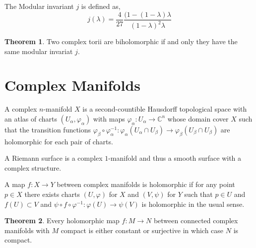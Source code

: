 \documentclass[12pt]{extarticle}
\newcommand{\C}{\mathbb{C}}
\theoremstyle{definition}
\newtheorem{theorem}{Theorem}[section]
\newenvironment{definition}[1][Definition:]{\begin{trivlist}
\item[\hskip \labelsep {\bfseries #1}]}{\end{trivlist}}
\begin{document}
\begin{definition}
The Modular invariant $j$ is defined as,
\[ j(\lambda) = \frac{4}{27} \frac{(1 - (1 - \lambda)\lambda}{(1 - \lambda)^2 \lambda} \]
\end{definition}  

\begin{theorem}
Two complex torii are biholomorphic if and only they have the same modular invariat $j$. 
\end{theorem}

\section{Complex Manifolds}

\begin{definition}
A complex $n$-manifold $X$ is a second-countible Hausdorff topological space with an atlas of charts $(U_{\alpha}, \varphi_{\alpha})$ with maps $\varphi_{\alpha} : U_{\alpha} \to \C^n$ whose domain cover $X$ such that the transition functions $\varphi_{\beta} \circ \varphi_{\alpha}^{-1} : \varphi_{\alpha}(U_{\alpha} \cap U_{\beta}) \to \varphi_{\beta}(U_{\beta} \cap U_{\beta})$ are holomorphic for each pair of charts. 
\end{definition}

\begin{definition}
A Riemann surface is a complex $1$-manifold and thus a smooth surface with a complex structure.  
\end{definition}

\begin{definition}
A map $f : X \to Y$ between complex manifolds is holomorphic if for any point $p \in X$ there exists charts $(U, \varphi)$ for $X$ and $(V, \psi)$ for $Y$ such that $p \in U$ and $f(U) \subset V$ and $\psi \circ f \circ \varphi^{-1} : \varphi(U) \to \psi(V)$ is holomorphic in the usual sense. 
\end{definition}

\begin{theorem}
Every holomorphic map $f : M  \to N$ between connected complex manifolds with $M$ compact is either constant or surjective in which case $N$ is compact. 
\end{theorem}
\end{document}
